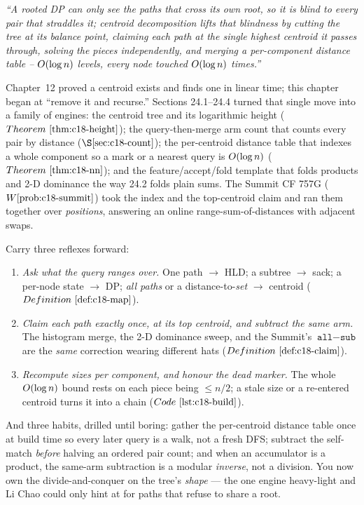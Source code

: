 \begin{lastword}
\emph{``A rooted DP can only see the paths that cross its own root, so it is blind to every pair
that straddles it; centroid decomposition lifts that blindness by cutting the tree at its balance
point, claiming each path at the single highest centroid it passes through, solving the pieces
independently, and merging a per-component distance table -- \(O(\log n)\) levels, every node
touched \(O(\log n)\) times.''}

\medskip
Chapter~12 proved a centroid exists and finds one in linear time; this chapter began at ``remove it
and recurse.'' Sections 24.1--24.4 turned that single move into a family of engines: the centroid
tree and its logarithmic height (\(\thmref{c18-height}\)); the query-then-merge arm count that
counts every pair by distance (\(\secref{c18-count}\)); the per-centroid distance table that indexes
a whole component so a mark or a nearest query is \(O(\log n)\) (\(\thmref{c18-nn}\)); and the
feature/accept/fold template that folds products and 2-D dominance the way 24.2 folds plain sums. The
Summit CF 757G (\(\probref{c18-summit}\)) took the index and the top-centroid claim and ran them
together over \emph{positions}, answering an online range-sum-of-distances with adjacent swaps.

\medskip
Carry three reflexes forward:
\begin{enumerate}[nosep, leftmargin=1.6em]
  \item \emph{Ask what the query ranges over.} One path \(\to\) HLD; a subtree \(\to\) sack; a
        per-node state \(\to\) DP; \emph{all paths} or a distance-to-\emph{set} \(\to\) centroid
        (\(\defref{c18-map}\)).
  \item \emph{Claim each path exactly once, at its top centroid, and subtract the same arm.} The
        histogram merge, the 2-D dominance sweep, and the Summit's \(\texttt{all}-\texttt{sub}\) are
        the \emph{same} correction wearing different hats (\(\defref{c18-claim}\)).
  \item \emph{Recompute sizes per component, and honour the dead marker.} The whole \(O(\log n)\)
        bound rests on each piece being \(\le n/2\); a stale size or a re-entered centroid turns it
        into a chain (\(\coderef{c18-build}\)).
\end{enumerate}

\medskip
And three habits, drilled until boring: gather the per-centroid distance table once at build time so
every later query is a walk, not a fresh DFS; subtract the self-match \emph{before} halving an ordered
pair count; and when an accumulator is a product, the same-arm subtraction is a modular \emph{inverse},
not a division. You now own the divide-and-conquer on the tree's \emph{shape} --- the one engine
heavy-light and Li Chao could only hint at for paths that refuse to share a root.


\end{lastword}
